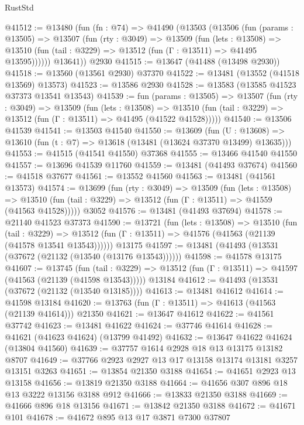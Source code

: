 \begin{lexlean}{RustStd}
\begin{coremodule}
@41512 := @13480
    (fun (fn : @74) =>
    @41490
      (@13503
        (@13506
          (fun (params : @13505) =>
          @13507
            (fun (rty : @3049) =>
            @13509
              (fun (lets : @13508) =>
              @13510 (fun (tail : @3229) => @13512 (fun (Γ : @13511) => @41495 @13595))))))
        @13641))
    @2930
@41515 := @13647 (@41488 (@13498 @2930))
@41518 := @13560 (@13561 @2930) @37370
@41522 := @13481 (@13552 (@41518 @13569) @13573)
@41523 := @13586 @2930
@41528 := @13583 (@13585 @41523 @37373 @13541 @13543)
@41539 := fun (params : @13505) =>
  @13507
    (fun (rty : @3049) =>
    @13509
      (fun (lets : @13508) =>
      @13510 (fun (tail : @3229) => @13512 (fun (Γ : @13511) => @41495 (@41522 @41528)))))
@41540 := @13506 @41539
@41541 := @13503 @41540
@41550 := @13609
    (fun (U : @13608) => @13610 (fun (t : @7) => @13618 (@13481 (@13624 @37370 @13499) @13635)))
@41553 := @41515 (@41541 @41550) @37368
@41555 := @13466 @41540 @41550
@41557 := @13696 @41539 @11760
@41559 := @13481 (@41493 @37674)
@41560 := @41518 @37677
@41561 := @13552 @41560
@41563 := @13481 (@41561 @13573)
@41574 := @13699
    (fun (rty : @3049) =>
    @13509
      (fun (lets : @13508) =>
      @13510 (fun (tail : @3229) => @13512 (fun (Γ : @13511) => @41559 (@41563 @41528)))))
    @3052
@41576 := @13481 (@41493 @37694)
@41578 := @21140 @41523 @37373
@41590 := @13721
    (fun (lets : @13508) =>
    @13510
      (fun (tail : @3229) =>
      @13512 (fun (Γ : @13511) => @41576 (@41563 (@21139 (@41578 @13541 @13543))))))
    @13175
@41597 := @13481 (@41493 (@13531 (@37672 (@21132 (@13540 (@13176 @13543))))))
@41598 := @41578 @13175
@41607 := @13745
    (fun (tail : @3229) => @13512 (fun (Γ : @13511) => @41597 (@41563 (@21139 (@41598 @13543)))))
    @13184
@41612 := @41493 (@13531 (@37672 (@21132 (@13540 @13185))))
@41613 := @13481 @41612
@41614 := @41598 @13184
@41620 := @13763 (fun (Γ : @13511) => @41613 (@41563 (@21139 @41614))) @21350
@41621 := @13647 @41612
@41622 := @41561 @37742
@41623 := @13481 @41622
@41624 := @37746 @41614
@41628 := @41621 (@41623 @41624) (@13799 @41492)
@41632 := @13647 @41622 @41624 (@13804 @41560)
@41639 := @37757 @1614 @2928 @18 @13 @13175 @13182 @8707
@41649 := @37766 @2923 @2927 @13 @17 @13158 @13174 @13181 @3257 @13151 @3263
@41651 := @13854 @21350 @3188
@41654 := @41651 @2923 @13 @13158
@41656 := @13819 @21350 @3188
@41664 := @41656 @307 @896 @18 @13 @3222 @13156 @3188 @912
@41666 := @13833 @21350 @3188
@41669 := @41666 @896 @18 @13156
@41671 := @13842 @21350 @3188
@41672 := @41671 @101
@41678 := @41672 @895 @13 @17 @3871 @7300 @37807

\end{coremodule}
\end{lexlean}
